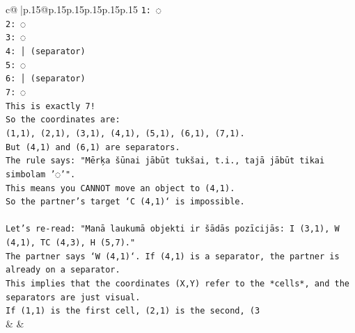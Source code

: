 \documentclass{article}
\begin{document}
{\begin{supertabular}{c@{$\;$}|p{.15\linewidth}@{}p{.15\linewidth}p{.15\linewidth}p{.15\linewidth}p{.15\linewidth}p{.15\linewidth}}
{{{\texttt{1: ◌} \\
\texttt{2: ◌} \\
\texttt{3: ◌} \\
\texttt{4: │ (separator)} \\
\texttt{5: ◌} \\
\texttt{6: │ (separator)} \\
\texttt{7: ◌} \\
\texttt{This is exactly 7!} \\
\texttt{So the coordinates are:} \\
\texttt{(1,1), (2,1), (3,1), (4,1), (5,1), (6,1), (7,1).} \\
\texttt{But (4,1) and (6,1) are separators.} \\
\texttt{The rule says: "Mērķa šūnai jābūt tukšai, t.i., tajā jābūt tikai simbolam '◌'".} \\
\texttt{This means you CANNOT move an object to (4,1).} \\
\texttt{So the partner's target `C (4,1)` is impossible.} \\
\\ 
\texttt{Let's re{-}read: "Manā laukumā objekti ir šādās pozīcijās: I (3,1), W (4,1), TC (4,3), H (5,7)."} \\
\texttt{The partner says `W (4,1)`. If (4,1) is a separator, the partner is already on a separator.} \\
\texttt{This implies that the coordinates (X,Y) refer to the *cells*, and the separators are just visual.} \\
\texttt{If (1,1) is the first cell, (2,1) is the second, (3} \\
            }
        }
    }
    & & \\ \\


\end{supertabular}}
\end{document}
